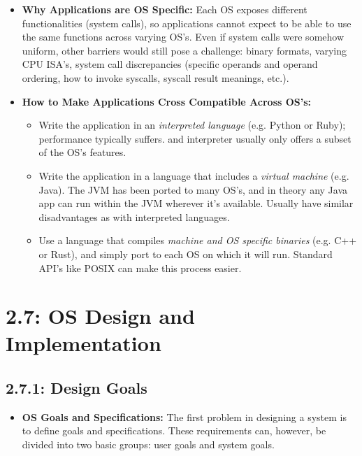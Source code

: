 \documentclass[12pt]{article}
\begin{document}
\begin{itemize}
    \item \textbf{Why Applications are OS Specific:} Each OS exposes different functionalities (system calls), so applications cannot expect to be able to use the same functions across varying OS's. Even if system calls were somehow uniform, other barriers would still pose a challenge: binary formats, varying CPU ISA's, system call discrepancies (specific operands and operand ordering, how to invoke syscalls, syscall result meanings, etc.).
    \item \textbf{How to Make Applications Cross Compatible Across OS's:}
    \begin{itemize}
        \item Write the application in an \textit{interpreted language} (e.g. Python or Ruby); performance typically suffers. and interpreter usually only offers a subset of the OS's features.
        \item Write the application in a language that includes a \textit{virtual machine} (e.g. Java). The JVM has been ported to many OS's, and in theory any Java app can run within the JVM wherever it's available. Usually have similar disadvantages as with interpreted languages.
        \item Use a language that compiles \textit{machine and OS specific binaries} (e.g. C++ or Rust), and simply port to each OS on which it will run. Standard API's like POSIX can make this process easier.
    \end{itemize}
\end{itemize}

\section*{2.7: OS Design and Implementation}

\subsection*{2.7.1: Design Goals}

\begin{itemize}
    \item \textbf{OS Goals and Specifications:} The first problem in designing a system is to define goals and specifications. These requirements can, however, be divided into two basic groups: user goals and system goals.
\end{itemize}
\end{document}
